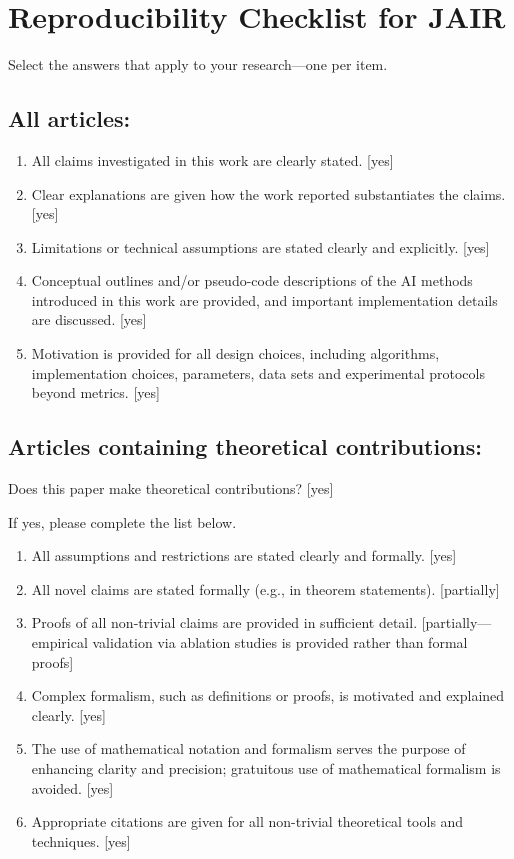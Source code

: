 \documentclass[manuscript, screen, review]{jair}
\begin{document}
\printbibliography

\appendix

\section{Reproducibility Checklist for JAIR}

Select the answers that apply to your research---one per item.

\subsection*{All articles:}

\begin{enumerate}
  \item All claims investigated in this work are clearly stated. [yes]
  \item Clear explanations are given how the work reported substantiates the claims. [yes]
  \item Limitations or technical assumptions are stated clearly and explicitly. [yes]
  \item Conceptual outlines and/or pseudo-code descriptions of the AI methods introduced in this work are provided, and important implementation details are discussed. [yes]
  \item Motivation is provided for all design choices, including algorithms, implementation choices, parameters, data sets and experimental protocols beyond metrics. [yes]
\end{enumerate}

\subsection*{Articles containing theoretical contributions:}

Does this paper make theoretical contributions? [yes]

If yes, please complete the list below.

\begin{enumerate}
  \item All assumptions and restrictions are stated clearly and formally. [yes]
  \item All novel claims are stated formally (e.g., in theorem statements). [partially]
  \item Proofs of all non-trivial claims are provided in sufficient detail. [partially---empirical validation via ablation studies is provided rather than formal proofs]
  \item Complex formalism, such as definitions or proofs, is motivated and explained clearly. [yes]
  \item The use of mathematical notation and formalism serves the purpose of enhancing clarity and precision; gratuitous use of mathematical formalism is avoided. [yes]
  \item Appropriate citations are given for all non-trivial theoretical tools and techniques. [yes]
\end{enumerate}
\end{document}
